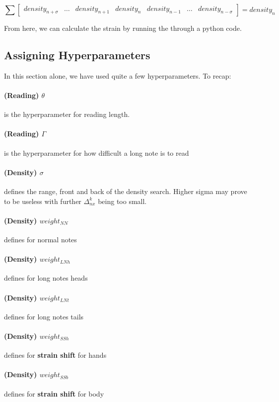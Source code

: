 $$ \sum
\begin{bmatrix}
	density_{n+\sigma} & \dots & density_{n+1} & density_{n} & density_{n-1} & \dots & density_{n-\sigma} 
\end{bmatrix}
= density_n
$$ 

From here, we can calculate the strain by running the through a python code.

\subsection{Assigning Hyperparameters}

In this section alone, we have used quite a few hyperparameters. To recap:

\paragraph{(Reading) $\theta$} is the hyperparameter for reading length.
\paragraph{(Reading) $\Gamma$} is the hyperparameter for how difficult a long note is to read

\paragraph{(Density) $\sigma$} defines the range, front and back of the density search. Higher sigma may prove to be useless with further $\Delta_{nx}^k$ being too small.

\paragraph{(Density) $weight_{NN}$} defines for normal notes
\paragraph{(Density) $weight_{LNh}$} defines for long notes heads
\paragraph{(Density) $weight_{LNt}$} defines for long notes tails
\paragraph{(Density) $weight_{SSh}$} defines for \textbf{strain shift} for hands
\paragraph{(Density) $weight_{SSb}$} defines for \textbf{strain shift} for body 

